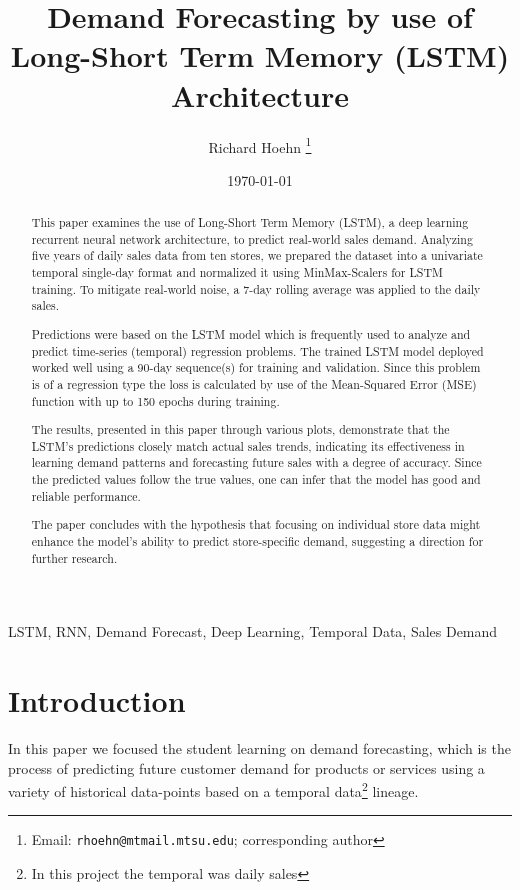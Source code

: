 \documentclass[10pt, conference, compsoc]{IEEEtran}
\title{Demand Forecasting by use of\\Long-Short Term Memory (LSTM) Architecture}
\author{Richard Hoehn%
	\thanks{Email: \texttt{rhoehn@mtmail.mtsu.edu}; corresponding author}}
\affil{Middle Tennessee State University\\ \small CSCI 7850\\ \small Prof. Dr. Joshua L. Phillips}
\date{\vspace{1em}\today}
\begin{document}
\maketitle
\thispagestyle{plain}
\pagestyle{plain}

\begin{abstract}
This paper examines the use of Long-Short Term Memory (LSTM), a deep learning recurrent neural network architecture, to predict real-world sales demand. Analyzing five years of daily sales data from ten stores, we prepared the dataset into a univariate temporal single-day format and normalized it using MinMax-Scalers for LSTM training. To mitigate real-world noise, a 7-day rolling average was applied to the daily sales.

Predictions were based on the LSTM model which is frequently used to analyze and predict time-series (temporal) regression problems. The trained LSTM model deployed worked well using a 90-day sequence(s) for training and validation. Since this problem is of a regression type the loss is calculated by use of the Mean-Squared Error (MSE) function with up to 150 epochs during training.

The results, presented in this paper through various plots, demonstrate that the LSTM's predictions closely match actual sales trends, indicating its effectiveness in learning demand patterns and forecasting future sales with a degree of accuracy. Since the predicted values follow the true values, one can infer that the model has good and reliable performance.

The paper concludes with the hypothesis that focusing on individual store data might enhance the model's ability to predict store-specific demand, suggesting a direction for further research.
\end{abstract}

\begin{IEEEkeywords}
LSTM, RNN, Demand Forecast, Deep Learning, Temporal Data, Sales Demand
\end{IEEEkeywords}


\section{Introduction}
In this paper we focused the student learning on demand forecasting, which is the process of predicting future customer demand for products or services using a variety of historical data-points based on a temporal data\footnote{In this project the temporal was daily sales} lineage.
\end{document}
